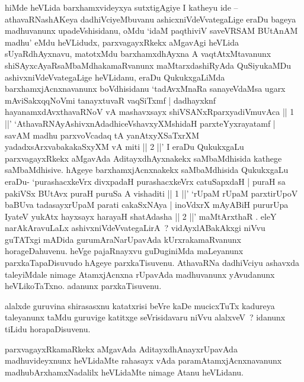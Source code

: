 \begin{artha}
hiMde heVLida barxhamxvideyxya sutxtigAgiye I katheyu ide -- athavaRNashAKeya dadhiVciyeMbuvanu ashicxniVdeVvategaLige eraDu bageya madhuvanunx upadeVshisidanu, oMdu `idaM paqthiviV saveVRSAM BUtAnAM madhu' eMdu heVLidudx, parxvagayxRkekx aMgavAgi heVLida sUyaRdhAyxnavu, matotxMdu barxhamxdhAyxna A vaqtAtxMtavanunx shiSAyxcAyaRsaMbaMdhakamaRvanunx maMtarxdashiRyAda QuSiyukaMDu  ashivxniVdeVvategaLige heVLidanu, eraDu QukukxgaLiMda barxhamxjAcnxnavanunx boVdhisidanu `tadAvxMnaRa sanayeVdaMsa ugarx mAviSakxqqNoVmi tanayxtuvaR vaqSiTxmf | dadhayxknf hayanamxdAvxthavaRNoV vA mashavxsayx shiVSANxRparxyadiVmuvAca || 1 ||' `AthavaRNAyAshivxnAdadhiceVshavxyXMshidaH parxteYyxrayatamf | savAM madhu parxvoVcadaq tA  yanAtxyXSaTxrXM yadadxsArxvabakakaSxyXM vA miti || 2 ||' I eraDu QukukxgaLu parxvagayxRkekx aMgavAda AditayxdhAyxnakekx saMbaMdhisida kathege saMbaMdhisive. hAgeye barxhamxjAcnxnakekx saMbaMdhisida QukukxgaLu eraDu- `purashacxkeVrx divxpadaH purashacxkeVrx catuSapxdaH | puraH sa pakiVSx BUtAvx puraH puruSa A vishaditi || 1 ||' `rUpaM rUpaM parxtirUpoV baBUva tadasayxrUpaM parati cakaSxNAya | inoVdxrX mAyABiH pururUpa IyateV yukAtx hayxsayx harayaH shatAdasha || 2 ||'  maMtArxthaR . eleY narAkAravuLaLx ashivxniVdeVvategaLirA~? vidAyxlABakAkxgi niVvu guTATxgi mADida gurumAraNarUpavAda kUrxrakamaRvanunx horageDahuvenu. heVge pajaRnayxvu guDuginiMda maLeyanunx parxkaTapaDisuvudo hAgeye parxkaTisuvenu. AthavaRNa dadhiVciyu ashavxda taleyiMdale nimage AtamxjAcnxna rUpavAda madhuvanunx yAvudanunx heVLikoTaTxno. adanunx parxkaTisuvenu.
\end{artha}

\begin{artha}
alalxde guruvina shirasasxnu katatxrisi beVre kaDe mucicxTuTx kadureya taleyanunx taMdu guruvige katitxge seVrisidavaru niVvu alalxveV~? idanunx tiLidu horapaDisuvenu.
\end{artha}

\begin{artha}
parxvagayxRkamaRkekx aMgavAda AditayxdhAnayxrUpavAda madhuvideyxnunx heVLidaMte rahasayx vAda paramAtamxjAcnxnavanunx madhubArxhamxNadalilx heVLidaMte nimage Atanu heVLidanu.
\end{artha}

\centerline{}

